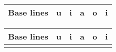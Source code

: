 
\begin{tabular}{c c | c c c c c}
\multicolumn{2}{c}{Base lines} & u & i & a & o & i \\
\hline

\end{tabular}


\begin{tabular}{c c | c c c c c}
\multicolumn{2}{c}{Base lines} & u & i & a & o & i \\
\hline


\num 
\end{tabular}

